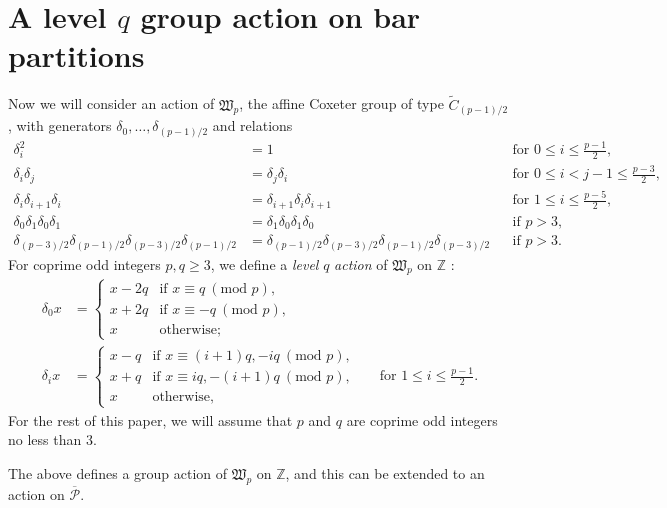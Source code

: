 \documentclass[ALCO, Unicode,published]{cedram}
\newcommand*\nicefrac[2]{#1/#2}
\begin{document}
\section{A level $q$ group action on bar partitions}
 
Now we will consider an action of $\mathfrak{W}_p$, the affine Coxeter group of type $\tilde{C}_{\nicefrac{(p-1)}{2}}$, with generators $\delta_0, \dots, \delta_{\nicefrac{(p-1)}{2}}$ and relations 
\begin{align*}\delta_i^2&=1&&\text{for }0\leq{i}\leq\tfrac{p-1}{2},\\
\delta_i\delta_j&=\delta_j\delta_i&&\text{for }0\leq{i}<j-1\leq\tfrac{p-3}{2},\\
\delta_i\delta_{i+1}\delta_i&=\delta_{i+1}\delta_i\delta_{i+1}&&\text{for }1\leq{i}\leq\tfrac{p-5}{2},\\
\delta_0\delta_1\delta_0\delta_1&=\delta_1\delta_0\delta_1\delta_0&&\text{if }p>3,\\
\delta_{\nicefrac{(p-3)}{2}}\delta_{\nicefrac{(p-1)}{2}}\delta_{\nicefrac{(p-3)}{2}}\delta_{\nicefrac{(p-1)}{2}}&=\delta_{\nicefrac{(p-1)}{2}}\delta_{\nicefrac{(p-3)}{2}}\delta_{\nicefrac{(p-1)}{2}}\delta_{\nicefrac{(p-3)}{2}}&&\text{if }p>3.\end{align*}
For coprime odd integers $p,q\geq3$, we define a \textit{level} $q$ \textit{action} of $\mathfrak{W}_p$ on $\mathbb{Z}$ \cite{F3}: 
\begin{align*}\delta_0x&=\begin{cases}x-2q&\text{if }x\equiv q\:(\text{mod }p),\\
x+2q&\text{if }x\equiv-q\:(\text{mod }p),\\
x&\text{otherwise;}\end{cases}\\ 
\delta_ix&=\begin{cases}x-q&\text{if }x\equiv(i+1)q,-iq\:(\text{mod }p),\\
x+q&\text{if }x\equiv iq,-(i+1)q\:(\text{mod }p),\\
x&\text{otherwise,}\end{cases}&&\text{for }1\leq i\leq\tfrac{p-1}{2}.\end{align*}
For the rest of this paper, we will assume that $p$ and $q$ are coprime odd integers no less than 3. 
\begin{lemm}
The above defines a group action of $\mathfrak{W}_p$ on $\mathbb{Z}$, and this can be extended to an action on $\overline{\mathcal{P}}$.
\end{lemm}
\end{document}
